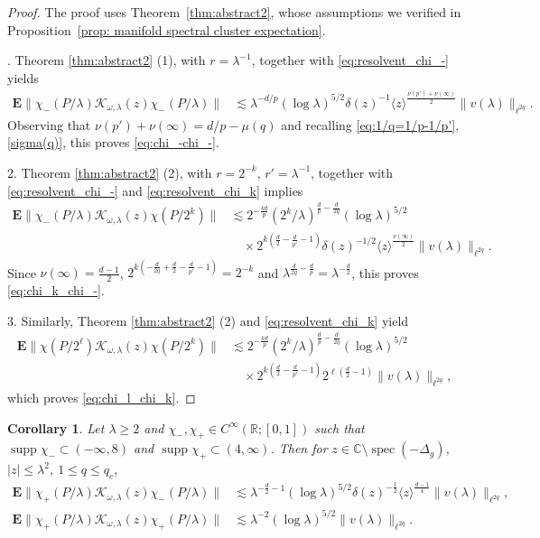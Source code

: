 \documentclass[12pt,reqno]{amsart}
\newtheorem{corollary}[theorem]{Corollary}
\theoremstyle{definition}
\theoremstyle{remark}
\numberwithin{equation}{section}
\newcommand{\1}{\mathbbm{1}}
\newcommand{\C}{\mathbb{C}}
\newcommand{\R}{\mathbb{R}}
\DeclareMathOperator{\spec}{spec}
\DeclareMathOperator{\supp}{supp}
\begin{document}
\begin{proof}
The proof uses Theorem~\ref{thm:abstract2}, whose assumptions we verified in Proposition~\ref{prop: manifold spectral cluster expectation}. 

. Theorem \ref{thm:abstract2} (1), with $r=\lambda^{-1}$, together with \eqref{eq:resolvent_chi_-} yields
\begin{align*}
 \mathbf{E}\|\chi_-(P/\lambda)\mathcal{K}_{\omega,\lambda}(z)\chi_-(P/\lambda)\|
 &\lesssim 
 \lambda^{-d/p} (\log\lambda)^{5/2} \delta(z)^{-1} \langle z\rangle^{\frac{\nu(p')+\nu(\infty)}{2}}\|v(\lambda)\|_{\ell^{2q}}.
\end{align*}
Observing that $\nu(p')+\nu(\infty)=d/p-\mu(q)$ and recalling \eqref{eq:1/q=1/p-1/p'}, \eqref{sigma(q)}, this proves \eqref{eq:chi_-chi_-}.

2. Theorem \ref{thm:abstract2} (2), with $r=2^{-k}$, $r'=\lambda^{-1}$, together with \eqref{eq:resolvent_chi_-} and \eqref{eq:resolvent_chi_k} implies
\begin{align*}
 \mathbf{E}\|\chi_-(P/\lambda)\mathcal{K}_{\omega,\lambda}(z)\chi(P/2^k)\|
 &\lesssim 
 2^{-\frac{kd}{p}} (2^k/\lambda)^{\frac{d}{p}-\frac{d}{2q}}(\log\lambda)^{5/2}\\
&\quad\times 2^{k(\frac{d}{2}-\frac{d}{p'}-1)}\delta(z)^{-1/2} \langle z\rangle^{\frac{\nu(\infty)}{2}}\|v(\lambda)\|_{\ell^{2q}}.
\end{align*}
Since $\nu(\infty)=\frac{d-1}{2}$,
\(
2^{k(-\frac{d}{2q}+\frac{d}{2}-\frac{d}{p'}-1)}=2^{-k}
\)
and $\lambda^{\frac{d}{2q}-\frac{d}{p}}=\lambda^{-\frac{d}{2}}$,
this proves \eqref{eq:chi_k_chi_-}.

3. Similarly, Theorem \ref{thm:abstract2} (2) and \eqref{eq:resolvent_chi_k} yield
\begin{align*}
 \mathbf{E}\|\chi(P/2^\ell)\mathcal{K}_{\omega,\lambda}(z)\chi(P/2^k)\|
 &\lesssim 
 2^{-\frac{kd}{p}} (2^k/\lambda)^{\frac{d}{p}-\frac{d}{2q}}(\log\lambda)^{5/2}\\
&\quad\times 2^{k(\frac{d}{2}-\frac{d}{p'}-1)}2^{\ell(\frac{d}{2}-1)}\|v(\lambda)\|_{\ell^{2q}},
\end{align*}
which proves \eqref{eq:chi_l_chi_k}.
\end{proof}

\begin{corollary}\label{cor:chi_+chi_-and_chi_+chi_+}
Let $\lambda\geq 2$ and $\chi_-,\chi_+\in C^{\infty}(\R;[0,1])$ such that $\supp\chi_-\subset (-\infty,8)$ and $\supp\chi_+\subset (4,\infty)$. Then for $z\in\C\setminus\spec(-\Delta_g)$, $|z|\leq \lambda^2$, $1\leq q\leq q_c$,
\begin{align}
\mathbf{E}\|\chi_+(P/\lambda)\mathcal{K}_{\omega,\lambda}(z)\chi_-(P/\lambda)\|&\lesssim \lambda^{-\frac{d}{2}-1}(\log\lambda)^{5/2}\delta(z)^{-\frac{1}{2}} \langle z\rangle^{\frac{d-1}{4}}\|v(\lambda)\|_{\ell^{2q}},\label{eq:chi_+_chi_-}\\
\mathbf{E}\|\chi_+(P/\lambda)\mathcal{K}_{\omega,\lambda}(z)\chi_+(P/\lambda)\|&\lesssim \lambda^{-2}(\log\lambda)^{5/2}\|v(\lambda)\|_{\ell^{2q}}\label{eq:chi_+_chi_+}.
\end{align}
\end{corollary}
\end{document}
